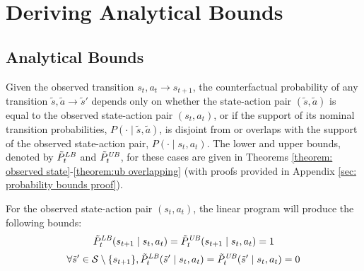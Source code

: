 \section{Deriving Analytical Bounds}
\label{sec: bounds}
%

\subsection{Analytical Bounds}
Given the observed transition $s_t, a_t \rightarrow s_{t+1}$, the counterfactual probability of any transition $\tilde{s}, \tilde{a} \rightarrow \tilde{s}'$ depends only on whether the state-action pair $(\tilde{s}, \tilde{a})$ is equal to the observed state-action pair $(s_t, a_t)$, or if the support of its nominal transition probabilities, $P(\cdot \mid \tilde{s}, \tilde{a})$, is disjoint from or overlaps with the support of the observed state-action pair, $P(\cdot \mid s_t, a_t)$. The lower and upper bounds, denoted by $\tilde{P}_{t}^{\it LB}$ and $\tilde{P}_{t}^{\it UB}$, for these cases are given in Theorems \ref{theorem: observed state}-\ref{theorem:ub overlapping} (with proofs provided in Appendix \ref{sec: probability bounds proof}).
%
%

\begin{theorem}
\label{theorem: observed state}
For the observed state-action pair $(s_t, a_t)$, the linear program will produce the following bounds:
{
%
\[\tilde{P}_{t}^{\it LB}(s_{t+1} \mid s_t, a_t) = \tilde{P}_{t}^{\it UB}(s_{t+1} \mid s_t, a_t) = 1\] 
\[\forall \tilde{s}' \in \mathcal{S} \setminus \{s_{t+1}\}, \tilde{P}_{t}^{\it LB}(\tilde{s}' \mid s_t, a_t) = \tilde{P}_{t}^{\it UB}(\tilde{s}' \mid s_t, a_t) = 0\]
}
\end{theorem}

